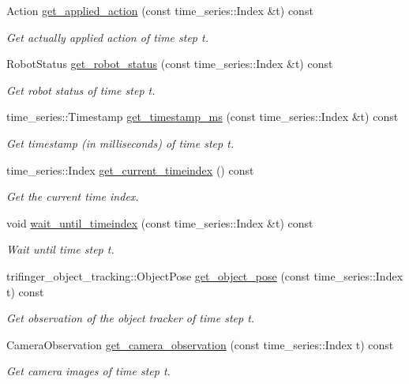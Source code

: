\begin{DoxyCompactItemize}
$$Action \hyperlink{classrobot__fingers_1_1TriFingerPlatformFrontend_a7c0d56e7e1096a3ab299a45e8b832d54}{get\+\_\+applied\+\_\+action} (const time\+\_\+series\+::\+Index \&t) const
\begin{DoxyCompactList}\small\item\em Get actually applied action of time step t. \end{DoxyCompactList}\item 
Robot\+Status \hyperlink{classrobot__fingers_1_1TriFingerPlatformFrontend_afc30cd1aecd9967045a0365c21f964fe}{get\+\_\+robot\+\_\+status} (const time\+\_\+series\+::\+Index \&t) const
\begin{DoxyCompactList}\small\item\em Get robot status of time step t. \end{DoxyCompactList}\item 
time\+\_\+series\+::\+Timestamp \hyperlink{classrobot__fingers_1_1TriFingerPlatformFrontend_abf6ed97b5f5711058030733fb283aad6}{get\+\_\+timestamp\+\_\+ms} (const time\+\_\+series\+::\+Index \&t) const
\begin{DoxyCompactList}\small\item\em Get timestamp (in milliseconds) of time step t. \end{DoxyCompactList}\item 
time\+\_\+series\+::\+Index \hyperlink{classrobot__fingers_1_1TriFingerPlatformFrontend_a9c97379d70b40a023609521a83253177}{get\+\_\+current\+\_\+timeindex} () const
\begin{DoxyCompactList}\small\item\em Get the current time index. \end{DoxyCompactList}\item 
void \hyperlink{classrobot__fingers_1_1TriFingerPlatformFrontend_a0dc8d9e0d6e26053194e223ac29fc8c4}{wait\+\_\+until\+\_\+timeindex} (const time\+\_\+series\+::\+Index \&t) const
\begin{DoxyCompactList}\small\item\em Wait until time step t. \end{DoxyCompactList}\item 
trifinger\+\_\+object\+\_\+tracking\+::\+Object\+Pose \hyperlink{classrobot__fingers_1_1TriFingerPlatformFrontend_abb39cc97fbf08af6942f2de3e99e6f54}{get\+\_\+object\+\_\+pose} (const time\+\_\+series\+::\+Index t) const
\begin{DoxyCompactList}\small\item\em Get observation of the object tracker of time step t. \end{DoxyCompactList}\item 
Camera\+Observation \hyperlink{classrobot__fingers_1_1TriFingerPlatformFrontend_a2b83c7b23977185f4a522e16077b204a}{get\+\_\+camera\+\_\+observation} (const time\+\_\+series\+::\+Index t) const
\begin{DoxyCompactList}\small\item\em Get camera images of time step t. \end{DoxyCompactList}\end{DoxyCompactItemize}
